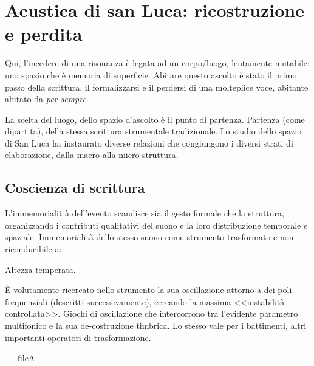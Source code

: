 
\chapter{Acustica di san Luca: ricostruzione e perdita}
\label{cap:acustica}


%
%
%
%
Qui, l’incedere di una risonanza è legata ad un corpo/luogo, lentamente mutabile:
uno spazio che è memoria di superficie. Abitare questo ascolto è stato il primo
passo della scrittura, il formalizzarsi e il perdersi di una molteplice voce,
abitante abitato da \emph{per sempre}.

La scelta del luogo, dello spazio d'ascolto è il punto di partenza.
Partenza (come dipartita), della stessa scrittura strumentale tradizionale.
Lo studio dello spazio di San Luca ha instaurato diverse relazioni che
congiungono i diversi strati di elaborazione, dalla macro alla micro-struttura.
%
%
%
%
%
\section{Coscienza di scrittura}

L'immemorialit à dell'evento scandisce sia il gesto formale che la struttura,
organizzando i contributi qualitativi del suono e la loro distribuzione
temporale e spaziale. Immemorialità dello stesso suono come strumento trasformato
e non riconducibile a:

Altezza temperata.

È volutamente ricercato nello strumento la sua oscillazione  attorno a dei
poli frequenziali (descritti successivamente), cercando la massima <<instabilità-controllata>>.
Giochi di oscillazione che intercorrono tra l’evidente parametro multifonico e la sua de-costruzione timbrica.
Lo stesso vale per i battimenti, altri importanti operatori di trasformazione.


-----fileA------



